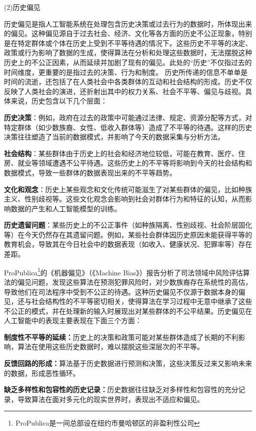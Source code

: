 (2)历史偏见

历史偏见是指人工智能系统在处理包含历史决策或过去行为的数据时，所体现出来的偏见。这种偏见源自于过去社会、经济、文化等各方面的历史不公正现象，特别是在特定群体或个体在历史上受到不平等待遇的情况下。这些历史不平等的决定、政策或行为影响了数据的生成，使得算法在分析和处理这些数据时，无法摆脱这种历史上的不公正因素，从而延续并加剧了现有的偏见。此处的“历史”不仅指过去的时间维度，更重要的是指过去的决策、行为和制度。 历史所传递的信息不单单是时间的流逝，还包括了在人类社会中各类群体的互动和社会结构的形成。历史不仅反映了人类社会的演进，还折射出其中的权力关系、社会不平等、偏见与歧视。具体来说，历史包含以下几个层面：

\textbf{历史决策}：例如，政府在过去的政策中可能通过法律、规定、资源分配等方式，对特定群体（如少数族裔、女性、低收入群体等）造成了不平等的待遇。这样的历史决策往往塑造了当前的数据模式，并影响了今天的数据采集与分析方法。

\textbf{社会结构}：某些群体由于历史上的社会和经济地位较低，可能在教育、医疗、住房、就业等领域遭遇不公平待遇。这些历史上的不平等将影响到今天的社会结构和数据模式，导致一些群体的数据表现出来的不平等趋势。

\textbf{文化和观念}：历史上某些观念和文化传统可能滋生了对某些群体的偏见，比如种族主义、性别歧视等。这些文化观念会影响到社会对群体行为和特征的认知，从而影响数据的产生和人工智能模型的训练。

\textbf{历史遗留问题}：某些历史上的不公正事件（如种族隔离、性别歧视、社会阶层固化等）在今天仍然存在其遗留问题。例如，某些社会群体因历史原因未能获得平等的教育机会，导致其在今日社会中的数据表现（如收入、健康状况、犯罪率等）存在差距。

ProPublica\footnote{ProPublica是一间总部设在纽约市曼哈顿区的非盈利性公司}的《机器偏见》（《Machine Bias》）报告分析了司法领域中风险评估算法的偏见问题，发现这些算法在预测犯罪风险时，对少数族裔存在系统性的高估，导致他们在司法程序中受到不公正的待遇。这种历史偏见不仅源于数据本身的偏见，还与社会结构性的不平等密切相关，使得算法在学习过程中无意中继承了这些不公正的模式，并在处理新的输入时展现出对某些群体的不公平结果。历史偏见在人工智能中的表现主要表现在下面三个方面：

\textbf{制度性不平等的延续：}历史上的决策和政策可能对某些群体造成了长期的不利影响，算法在使用这些历史数据时，难以摆脱这些深层次的不平等。

\textbf{反馈回路的形成：}算法基于历史数据进行预测和决策，这些决策反过来又影响未来的数据，形成恶性循环。

\textbf{缺乏多样性和包容性的历史记录：}历史数据往往缺乏对多样性和包容性的充分记录，导致算法在面对多元化的现实世界时，表现出不适应和偏见。

